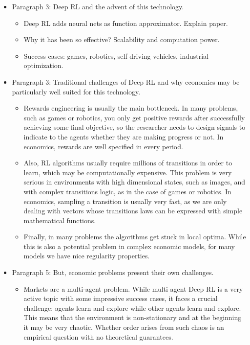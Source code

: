\documentclass[11pt,english]{article}
\begin{document}
\begin{itemize}
	\item Paragraph 3: Deep RL and the advent of this technology. \medskip 
	
			\begin{itemize}
			\item Deep RL adds neural nets as function approximator. Explain \citet{mnih2013} paper. \medskip
			\item Why it has been so effective? Scalability and computation power. \medskip
			\item Success cases: games, robotics, self-driving vehicles, industrial optimization. 
		\end{itemize}

	\item Paragraph 3: Traditional challenges of Deep RL and why economics may be particularly well suited for this technology.\medskip
	
	\begin{itemize}
		\item Rewards engineering is usually the main bottleneck. In many problems, such as games or robotics, you only get positive rewards after successfully achieving some final objective, so the researcher needs to design signals to indicate to the agents whether they are making progress or not. In economics, rewards are well specified in every period. \medskip
		
		\item Also, RL algorithms usually require millions of transitions in order to learn, which may be computationally expensive. This problem is very serious in environments with high dimensional states, such as images, and with complex transitions logic, as in the case of games or robotics. In economics, sampling a transition is usually very fast, as we are only dealing with vectors whose transitions laws can be expressed with simple mathematical functions. \medskip
		
		\item Finally, in many problems the algorithms get stuck in local optima. While this is also a potential problem in complex economic models, for many models we have nice regularity properties. \medskip
	\end{itemize}
	

	\item Paragraph 5: But, economic problems present their own challenges. \medskip
	
	\begin{itemize}
		\item Markets are a multi-agent problem. While multi agent Deep RL is a very active topic with some impressive success cases, it faces a crucial challenge: agents learn and explore while other agents learn and explore. This means that the environment is non-stationary and at the beginning it may be very chaotic. Whether order arises from such chaos is an empirical question with no theoretical guarantees. \medskip
		

\end{itemize}
\end{itemize}
\end{document}
